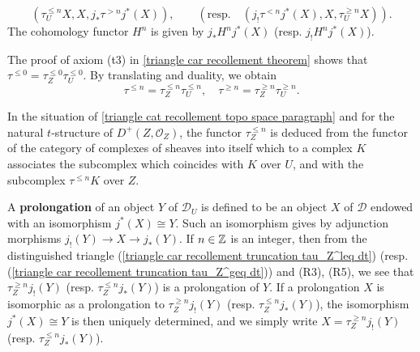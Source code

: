 \begin{equation}\label{triangle car recollement truncation tau_U dt}
(\tau^{\leq n}_UX,X,j_*\tau^{>n}j^*(X)),\quad\quad (\text{resp.}\quad (j_!\tau^{<n}j^*(X),X,\tau^{\geq n}_UX)).
\end{equation}
The cohomology functor $H^n$ is given by $j_*H^nj^*(X)$ (resp. $j_!H^nj^*(X)$).\par
The proof of axiom (t3) in \cref{triangle car recollement theorem} shows that $\tau^{\leq 0}=\tau^{\leq 0}_Z\tau^{\leq 0}_U$. By translating and duality, we obtain
\begin{equation}\label{triangle car recollement truncation functor decomposition}
\tau^{\leq n}=\tau^{\leq n}_Z\tau^{\leq n}_U,\quad \tau^{\geq n}=\tau^{\geq n}_Z\tau^{\geq n}_U.
\end{equation}

\begin{example}
In the situation of \ref{triangle cat recollement topo space paragraph} and for the natural $t$-structure of $D^+(Z,\mathscr{O}_Z)$, the functor $\tau_Z^{\leq n}$ is deduced from the functor of the category of complexes of sheaves into itself which to a complex $K$ associates the subcomplex which coincides with $K$ over $U$, and with the subcomplex $\tau^{\leq n}K$ over $Z$.
\end{example}

A \textbf{prolongation} of an object $Y$ of $\mathcal{D}_U$ is defined to be an object $X$ of $\mathcal{D}$ endowed with an isomorphism $j^*(X)\cong Y$. Such an isomorphism gives by adjunction morphisms $j_!(Y)\to X\to j_*(Y)$. If $n\in\mathbb{Z}$ is an integer, then from the distinguished triangle (\ref{triangle car recollement truncation tau_Z^leq dt}) (resp. (\ref{triangle car recollement truncation tau_Z^geq dt})) and (R3), (R5), we see that $\tau^{\geq n}_Zj_!(Y)$ (resp. $\tau_Z^{\leq n}j_*(Y)$) is a prolongation of $Y$. If a prolongation $X$ is isomorphic as a prolongation to $\tau^{\geq n}_Zj_!(Y)$ (resp. $\tau_Z^{\leq n}j_*(Y)$), the isomorphism $j^*(X)\cong Y$ is then uniquely determined, and we simply write $X=\tau^{\geq n}_Zj_!(Y)$ (resp. $\tau_Z^{\leq n}j_*(Y)$).

